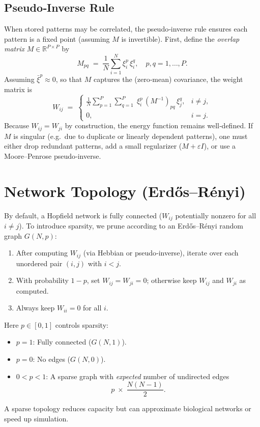 \documentclass{article}
\begin{document}
\subsection{Pseudo‐Inverse Rule}
\label{sec:pseudoinverse}
When stored patterns may be correlated, the pseudo‐inverse rule ensures each pattern is a fixed point (assuming $M$ is invertible).  First, define the \emph{overlap matrix} $M \in \mathbb{R}^{P\times P}$ by
\[
M_{pq}
\;=\;
\frac{1}{N} \sum_{i=1}^{N} \xi_i^p \,\xi_i^q,\quad
p,q = 1,\dots,P.
\]
Assuming $\bar{\xi}^p \approx 0$, so that $M$ captures the (zero‐mean) covariance, the weight matrix is
\[
W_{ij}
\;=\;
\begin{cases}
\displaystyle
\frac{1}{N}\sum_{p=1}^{P}\sum_{q=1}^{P} \;\xi_i^p\,(M^{-1})_{pq}\,\xi_j^q, 
& i \neq j,\\[1em]
0, 
& i = j.
\end{cases}
\]
Because $W_{ij} = W_{ji}$ by construction, the energy function remains well‐defined.  If $M$ is singular (e.g.\ due to duplicate or linearly dependent patterns), one must either drop redundant patterns, add a small regularizer ($M + \varepsilon I$), or use a Moore–Penrose pseudo‐inverse.

\section{Network Topology (Erdős–Rényi)}
By default, a Hopfield network is fully connected ($W_{ij}$ potentially nonzero for all $i \neq j$).  To introduce sparsity, we prune according to an Erdős–Rényi random graph $G(N,p)$:
\begin{enumerate}
    \item After computing $W_{ij}$ (via Hebbian or pseudo‐inverse), iterate over each unordered pair $(i,j)$ with $i<j$.
    \item With probability $1-p$, set $W_{ij} = W_{ji} = 0$; otherwise keep $W_{ij}$ and $W_{ji}$ as computed.
    \item Always keep $W_{ii} = 0$ for all $i$.
\end{enumerate}
Here $p\in[0,1]$ controls sparsity:
\begin{itemize}
    \item $p=1$: Fully connected ($G(N,1)$).
    \item $p=0$: No edges ($G(N,0)$).
    \item $0<p<1$: A sparse graph with \emph{expected} number of undirected edges 
    \[
    p \;\times\; \frac{N(N-1)}{2}.
    \]
\end{itemize}
A sparse topology reduces capacity but can approximate biological networks or speed up simulation.
\end{document}
